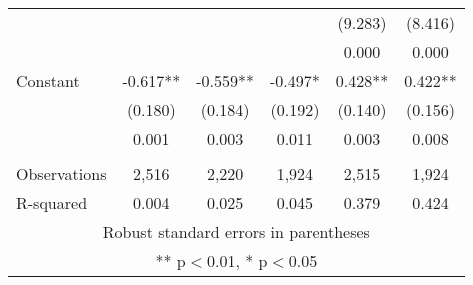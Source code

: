\begin{tabular}{lccccc}
 &  &  &  & (9.283) & (8.416) \\
 &  &  &  & 0.000 & 0.000 \\
Constant & -0.617** & -0.559** & -0.497* & 0.428** & 0.422** \\
 & (0.180) & (0.184) & (0.192) & (0.140) & (0.156) \\
 & 0.001 & 0.003 & 0.011 & 0.003 & 0.008 \\
 &  &  &  &  &  \\
Observations & 2,516 & 2,220 & 1,924 & 2,515 & 1,924 \\
 R-squared & 0.004 & 0.025 & 0.045 & 0.379 & 0.424 \\ \hline
\multicolumn{6}{c}{ Robust standard errors in parentheses} \\
\multicolumn{6}{c}{ ** p$<$0.01, * p$<$0.05} \\
\end{tabular}
